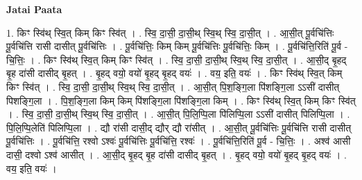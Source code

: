 \documentclass[17pt]{extarticle}
\begin{document}
\textbf{Jatai Paata} \newline

1. किꣳ स्वि॑थ् स्वि॒त् किम् किꣳ स्वि॑त् । . स्वि॒ दा॒सी॒ दा॒सी॒थ् स्वि॒थ् स्वि॒ दा॒सी॒त् । . आ॒सी॒त् पू॒र्वचि॑त्तिः पू॒र्वचि॑त्ति रासी दासीत् पू॒र्वचि॑त्तिः । . पू॒र्वचि॑त्तिः॒ किम् किम् पू॒र्वचि॑त्तिः पू॒र्वचि॑त्तिः॒ किम् । . पू॒र्वचि॑त्ति॒रिति॑ पू॒र्व - चि॒त्तिः॒ । . किꣳ स्वि॑थ् स्वि॒त् किम् किꣳ स्वि॑त् । . स्वि॒ दा॒सी॒ दा॒सी॒थ् स्वि॒थ् स्वि॒ दा॒सी॒त् । . आ॒सी॒द् बृ॒हद् बृ॒ह दा॑सी दासीद् बृ॒हत् । . बृ॒हद् वयो॒ वयो॑ बृ॒हद् बृ॒हद् वयः॑ । . वय॒ इति॒ वयः॑ । . किꣳ स्वि॑थ् स्वि॒त् किम् किꣳ स्वि॑त् । . स्वि॒ दा॒सी॒ दा॒सी॒थ् स्वि॒थ् स्वि॒ दा॒सी॒त् । . आ॒सी॒त् पि॒श॒ङ्गि॒ला पि॑शङ्गि॒ला ऽऽसी॑ दासीत् पिशङ्गि॒ला । . पि॒श॒ङ्गि॒ला किम् किम् पि॑शङ्गि॒ला पि॑शङ्गि॒ला किम् । . किꣳ स्वि॑थ् स्वि॒त् किम् किꣳ स्वि॑त् । . स्वि॒ दा॒सी॒ दा॒सी॒थ् स्वि॒थ् स्वि॒ दा॒सी॒त् । . आ॒सी॒त् पि॒लि॒प्पि॒ला पि॑लिप्पि॒ला ऽऽसी॑ दासीत् पिलिप्पि॒ला । . पि॒लि॒प्पि॒लेति॑ पिलिप्पि॒ला । . द्यौ रा॑सी दासी॒द् द्यौर् द्यौ रा॑सीत् । . आ॒सी॒त् पू॒र्वचि॑त्तिः पू॒र्वचि॑त्ति रासी दासीत् पू॒र्वचि॑त्तिः । . पू॒र्वचि॑त्ति॒ रश्वो ऽश्वः॑ पू॒र्वचि॑त्तिः पू॒र्वचि॑त्ति॒ रश्वः॑ । . पू॒र्वचि॑त्ति॒रिति॑ पू॒र्व - चि॒त्तिः॒ । . अश्व॑ आसी दासी॒ दश्वो ऽश्व॑ आसीत् । . आ॒सी॒द् बृ॒हद् बृ॒ह दा॑सी दासीद् बृ॒हत् । . बृ॒हद् वयो॒ वयो॑ बृ॒हद् बृ॒हद् वयः॑ । . वय॒ इति॒ वयः॑ । \newline
\end{document}
